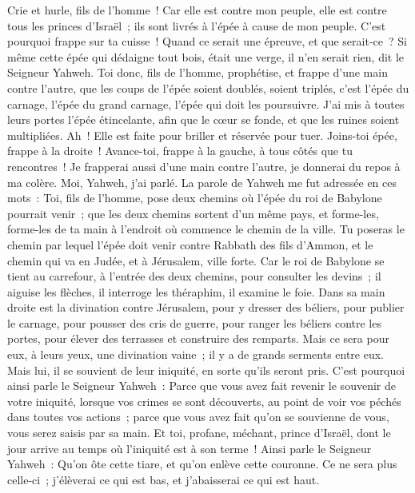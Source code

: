 \begin{multicols}{2}
Crie et hurle, fils de l'homme~! Car elle est contre mon peuple, elle est contre tous les princes d'Israël~; ils sont livrés à l'épée à cause de mon peuple. C'est pourquoi frappe sur ta cuisse~!
Quand ce serait une épreuve, et que serait-ce~? Si même cette épée qui dédaigne tout bois, était une verge, il n'en serait rien, dit le Seigneur Yahweh. 
Toi donc, fils de l'homme, prophétise, et frappe d'une main contre l'autre, que les coups de l'épée soient doublés, soient triplés, c'est l'épée du carnage, l'épée du grand carnage, l'épée qui doit les poursuivre.
J'ai mis à toutes leurs portes l'épée étincelante, afin que le cœur se fonde, et que les ruines soient multipliées. Ah~! Elle est faite pour briller et réservée pour tuer.
Joins-toi épée, frappe à la droite~! Avance-toi, frappe à la gauche, à tous côtés que tu rencontres~!
Je frapperai aussi d'une main contre l'autre, je donnerai du repos à ma colère. Moi, Yahweh, j'ai parlé.
La parole de Yahweh me fut adressée en ces mots~:
Toi, fils de l'homme, pose deux chemins où l'épée du roi de Babylone pourrait venir~; que les deux chemins sortent d'un même pays, et forme-les, forme-les de ta main à l'endroit où commence le chemin de la ville.
Tu poseras le chemin par lequel l'épée doit venir contre Rabbath des fils d'Ammon, et le chemin qui va en Judée, et à Jérusalem, ville forte.
Car le roi de Babylone se tient au carrefour, à l'entrée des deux chemins, pour consulter les devins~; il aiguise les flèches, il interroge les théraphim, il examine le foie.
Dans sa main droite est la divination contre Jérusalem, pour y dresser des béliers, pour publier le carnage, pour pousser des cris de guerre, pour ranger les béliers contre les portes, pour élever des terrasses et construire des remparts.
Mais ce sera pour eux, à leurs yeux, une divination vaine~; il y a de grands serments entre eux. Mais lui, il se souvient de leur iniquité, en sorte qu'ils seront pris.
C'est pourquoi ainsi parle le Seigneur Yahweh~: Parce que vous avez fait revenir le souvenir de votre iniquité, lorsque vos crimes se sont découverts, au point de voir vos péchés dans toutes vos actions~; parce que vous avez fait qu'on se souvienne de vous, vous serez saisis par sa main.
Et toi, profane, méchant, prince d'Israël, dont le jour arrive au temps où l'iniquité est à son terme~!
Ainsi parle le Seigneur Yahweh~: Qu'on ôte cette tiare, et qu'on enlève cette couronne. Ce ne sera plus celle-ci~; j'élèverai ce qui est bas, et j'abaisserai ce qui est haut.

\end{multicols}
